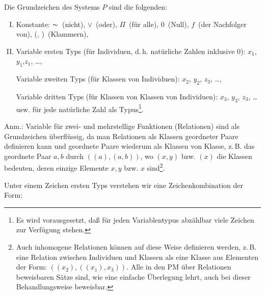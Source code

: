 \documentclass[draft]{scrartcl}
\begin{document}
Die Grundzeichen des Systems $P$ sind die folgenden:

\begin{enumerate}[I.]
	\item Konstante: \glqq $\thicksim$\grqq\ (nicht),
		\glqq$\lor$\grqq\ (oder), \glqq$\Pi{}$\grqq\ (für alle), %
		\glqq $0$\grqq\ (Null), \glqq$f$\grqq\ (der Nachfolger
		von), \glqq(\grqq, \glqq)\grqq\ (Klammern),

	\item Variable ersten Typs (für Individuen, d.\,h. 
		natürliche Zahlen inklusive 0): 
		\glqq$x_1$\grqq, \glqq$y_1$\grqq,\glqq$z_1$\grqq, \dots,

		Variable zweiten Typs (für Klassen von Individuen):
		\glqq$x_2$\grqq, \glqq$y_2$\grqq, \glqq$z_3$\grqq, \dots,

		Variable dritten Typs (für Klassen von Klassen von
		Individuen): \glqq$x_3$\grqq, \glqq$y_3$\grqq,
		\glqq$z_3$\grqq, \dots usw. für jede natürliche Zahl
		als Typus\footnote{Es wird vorausgesetzt, daß für 
		jeden Variablentypus abzählbar viele Zeichen zur Verfügung stehen.}.
\end{enumerate}

Anm.: Variable für zwei- und mehrstellige Funktionen
(Relationen) sind als Grundzeichen überflüssig, da man
Relationen als Klassen geordneter Paare definieren kann
und geordnete Paare wiederum als Klassen von Klasse, z.\,B.
das geordnete Paar $a, b$ durch $\left(\left(a\right), 
\left(a, b\right)\right)$, wo $\left(x, y\right)$ bzw. $\left(x\right)$ die 
Klassen bedeuten, deren einzige Elemente $x, y$ bzw. $x$ 
sind\footnote{Auch inhomogene Relationen können auf diese 
Weise definieren werden, z.\,B. eine Relation zwischen 
Individuen und Klassen als eine Klasse aus Elementen 
der Form: $\left(\left(x_2\right), \left(\left(x_1\right), x_3\right)\right)$. 
Alle in den PM über Relationen beweisbaren Sätze sind, wie eine 
einfache Überlegung lehrt, auch bei dieser Behandlungsweise beweisbar.}.

Unter einem Zeichen ersten Typs verstehen wir eine Zeichenkombination der Form:
\end{document}
